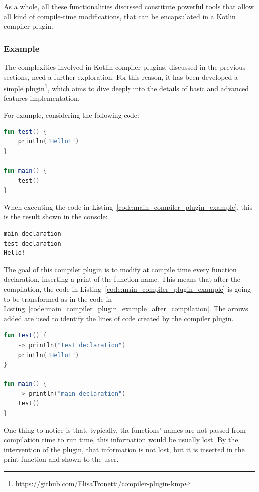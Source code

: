 As a whole, all these functionalities discussed constitute powerful tools that allow all kind of compile-time modifications, that can be encapsulated in a Kotlin compiler plugin.

\subsubsection{Example}\label{section:compiler_plugin_example}
The complexities involved in Kotlin compiler plugins, discussed in the previous sections, need a further exploration. For this reason, it has been developed a simple plugin\footnote{\url{https://github.com/ElisaTronetti/compiler-plugin-kmp}}, which aims to dive deeply into the details of basic and advanced features implementation.

For example, considering the following code:
\begin{lstlisting}[caption={Kotlin code without the modification of the compiler plugin created as an example}, captionpos=b, language=Kotlin, label={code:main_compiler_plugin_example}]
fun test() {
    println("Hello!")
}
    
fun main() {
    test()
}
\end{lstlisting}
When executing the code in Listing~\ref{code:main_compiler_plugin_example}, this is the result shown in the console:
\begin{lstlisting}[caption={Output of the execution of Listing~\ref{code:main_compiler_plugin_example} with the application of the compiler plugin created as an example}, captionpos=b, language=Kotlin, label={code:output_main_compiler_plugin_example}]
main declaration
test declaration
Hello!
\end{lstlisting}
The goal of this compiler plugin is to modify at compile time every function declaration, inserting a print of the function name. This means that after the compilation, the code in Listing~\ref{code:main_compiler_plugin_example} is going to be transformed as in the code in Listing~\ref{code:main_compiler_plugin_example_after_compilation}. The arrows added are used to identify the lines of code created by the compiler plugin.
\begin{lstlisting}[caption={Kotlin code with the modification of the compiler plugin created as an example}, captionpos=b, language=Kotlin, escapechar=\$, label={code:main_compiler_plugin_example_after_compilation}]
fun test() {
    -> println("test declaration")
    println("Hello!")
}

fun main() {
    -> println("main declaration")
    test()
}
\end{lstlisting}
One thing to notice is that, typically, the functions' names are not passed from compilation time to run time, this information would be usually lost. By the intervention of the plugin, that information is not lost, but it is inserted in the print function and shown to the user.


